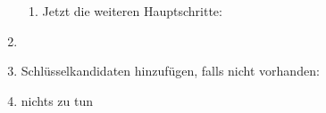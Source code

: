 \documentclass{lehramt-informatik-aufgabe}
\begin{document}
\begin{liAntwort}
\begin{enumerate}
\begin{enumerate}
\item {}


Jetzt die weiteren Hauptschritte:

\end{enumerate}

\item {}


\item {}

Schlüsselkandidaten hinzufügen, falls nicht vorhanden:


\item {}

nichts zu tun

\end{enumerate}
\end{liAntwort}
\end{document}
